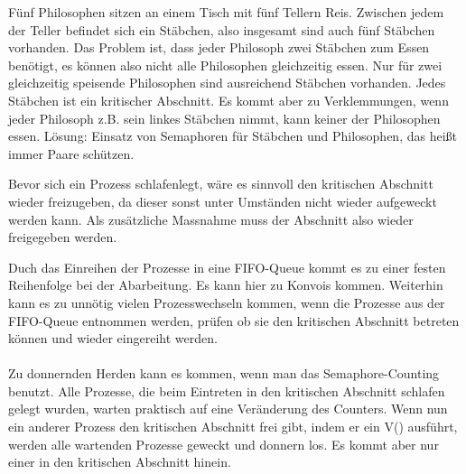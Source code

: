 \begin{answer}
Fünf Philosophen sitzen an einem Tisch mit fünf Tellern Reis. Zwischen jedem der Teller befindet
sich ein Stäbchen, also insgesamt sind auch fünf Stäbchen vorhanden. Das Problem ist, dass jeder Philosoph zwei Stäbchen zum Essen benötigt, es können also nicht alle Philosophen gleichzeitig essen. Nur für zwei gleichzeitig speisende Philosophen sind ausreichend Stäbchen vorhanden.
Jedes Stäbchen ist ein kritischer Abschnitt. Es kommt aber zu Verklemmungen, wenn jeder Philosoph z.B. sein linkes Stäbchen nimmt, kann keiner der Philosophen essen.
Lösung: Einsatz von Semaphoren für Stäbchen und Philosophen, das heißt immer Paare schützen.
\end{answer}

\begin{answer}
Bevor sich ein Prozess schlafenlegt, wäre es sinnvoll den kritischen Abschnitt wieder freizugeben, da dieser sonst unter Umständen nicht wieder aufgeweckt werden kann. Als zusätzliche Massnahme muss der Abschnitt also wieder freigegeben werden.
\end{answer}

\begin{answer}
Duch das Einreihen der Prozesse in eine FIFO-Queue kommt es zu einer festen Reihenfolge bei der Abarbeitung. Es kann hier zu Konvois kommen. Weiterhin kann es zu unnötig vielen Prozesswechseln kommen, wenn die Prozesse aus der FIFO-Queue entnommen werden, prüfen ob sie den kritischen Abschnitt betreten können und wieder eingereiht werden.

\paragraph*{}
Zu donnernden Herden kann es kommen, wenn man das Semaphore-Counting benutzt. Alle Prozesse, die beim Eintreten in den kritischen Abschnitt schlafen gelegt wurden, warten praktisch auf eine Veränderung des Counters. Wenn nun ein anderer Prozess den kritischen Abschnitt frei gibt, indem er ein V() ausführt, werden alle wartenden Prozesse geweckt und donnern los. Es kommt aber nur einer in den kritischen Abschnitt hinein.
\end{answer}

